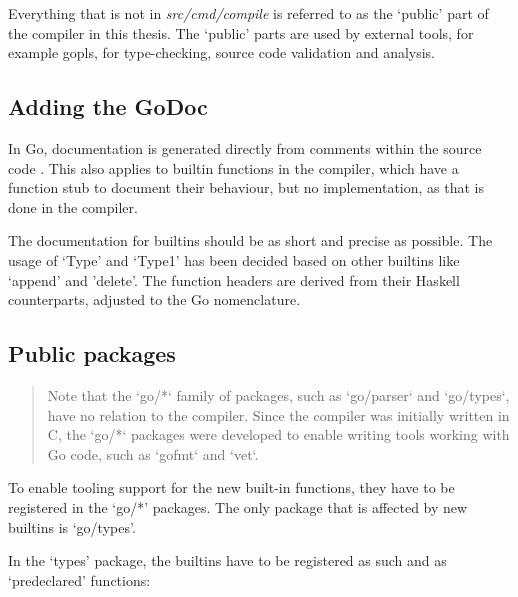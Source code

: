 
Everything that is not in \textit{src/cmd/compile} is referred to as the `public'
part of the compiler in this thesis. The `public' parts are used by external
tools, for example \gls{gopls}, for type-checking, source code validation and
analysis.

\subsection{Adding the GoDoc}
In Go, documentation is generated directly from comments within the source code
\autocite{godoc}. This also applies to builtin functions in the compiler, which
have a function stub to document their behaviour\autocite{godoc-builtin}, but
no implementation, as that is done in the compiler\autocite{builtin-impl}.

The documentation for builtins should be as short and precise as possible.
The usage of `Type' and `Type1' has been decided based on other builtins
like `append' and 'delete'.
The function headers are derived from their Haskell counterparts, adjusted
to the Go nomenclature.

\begin{code}
\end{code}

\subsection{Public packages}

\begin{quote}
Note that the `go/*` family of packages, such as `go/parser` and `go/types`,
have no relation to the compiler. Since the compiler was initially written in C,
the `go/*` packages were developed to enable writing tools working with Go code,
such as `gofmt` and `vet`.\autocite{compiler-readme}
\end{quote}

To enable tooling support for the new built-in functions, they have to be
registered in the `go/*' packages. The only package that is affected by new
builtins is `go/types'.

In the `types' package, the builtins have to be registered as such and as
`predeclared' functions:

